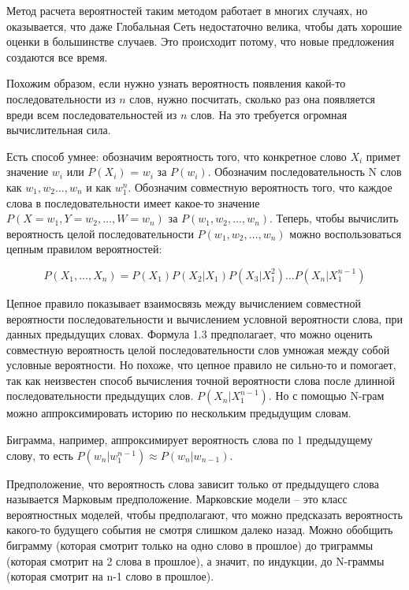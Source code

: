 \documentclass[a4paper,12pt,preview]{report} %
\begin{document}
	Метод расчета вероятностей таким методом работает в многих случаях, но оказывается, что даже Глобальная Сеть недостаточно велика, чтобы дать хорошие оценки в большинстве случаев. Это происходит потому, что новые предложения создаются все время.
	
	Похожим образом, если нужно узнать вероятность появления какой-то последовательности из $n$ слов, нужно посчитать, сколько раз она появляется вреди всем последовательностей из $n$ слов. На это требуется огромная вычислительная сила.
	
	Есть способ умнее:
	обозначим вероятность того, что конкретное слово $X_i$ примет значение $w_i$ или $P(X_i)$ = $w_i$ за $P(w_i)$. Обозначим последовательность N слов как $w_1, w_2 \dots, w_n$ и как $w_1^n$. Обозначим совместную вероятность того, что каждое слова в последовательности имеет какое-то значение $P(X = w_1, Y = w_2, \dots, W = w_n)$ за $P(w_1, w_2, \dots, w_n)$. Теперь, чтобы вычислить вероятность целой последовательности $P(w_1, w_2, \dots, w_n)$ можно воспользоваться цепным правилом вероятностей: 
	
	\begin{equation}
	P(X_1, \dots, X_n) = P(X_1) P(X_2 | X_1) P(X_3 | X_1^2) \dots P(X_n | X_1^{n-1})
	\end{equation}
	 
	 Цепное правило показывает взаимосвязь между вычислением совместной вероятности последовательности и вычислением условной вероятности слова, при данных предыдущих словах. Формула 1.3 предполагает, что можно оценить совместную вероятность целой последовательности слов умножая между собой условные вероятности. Но похоже, что цепное правило не сильно-то и помогает, так как неизвестен способ вычисления точной вероятности слова после длинной последовательности предыдущих слов. $P(X_n | X_1^{n-1})$. Но с помощью N-грам можно аппроксимировать историю по нескольким предыдущим словам. 
	
	Биграмма, например, аппроксимирует вероятность слова по 1 предыдущему слову, то есть
	$P(w_n | w_1^{n-1}) \approx P(w_n | w_{n-1})$. 
	
	Предположение, что вероятность слова зависит только от предыдущего слова называется Марковым предположение. Марковские модели \cite{13} -- это класс вероятностных моделей, чтобы предполагают, что можно предсказать вероятность какого-то будущего события не смотря слишком далеко назад. Можно обобщить биграмму (которая смотрит только на одно слово в прошлое) до триграммы (которая смотрит на 2 слова в прошлое), а значит, по индукции, до N-граммы (которая смотрит на n-1 слово в прошлое).
	
\end{document}

